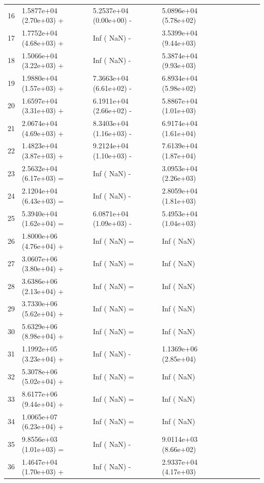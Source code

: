 \documentclass[11pt]{article}
\begin{document}
\begin{table}[htbp]
{\begin{tabular}{lllllllll}
16    & 1.5877e+04 (2.70e+03) + & 5.2537e+04 (0.00e+00) - & 5.0896e+04 (5.78e+02) \\
17    & 1.7752e+04 (4.68e+03) + & Inf (     NaN) -        & 3.5399e+04 (9.44e+03) \\
18    & 1.5066e+04 (3.22e+03) + & Inf (     NaN) -        & 5.3874e+04 (9.93e+03) \\
19    & 1.9880e+04 (1.57e+03) + & 7.3663e+04 (6.61e+02) - & 6.8934e+04 (5.98e+02) \\
20    & 1.6597e+04 (3.31e+03) + & 6.1911e+04 (2.66e+02) - & 5.8867e+04 (1.01e+03) \\
21    & 2.0674e+04 (4.69e+03) + & 8.3403e+04 (1.16e+03) - & 6.9174e+04 (1.61e+04) \\
22    & 1.4823e+04 (3.87e+03) + & 9.2124e+04 (1.10e+03) - & 7.6139e+04 (1.87e+04) \\
23    & 2.5632e+04 (6.17e+03) = & Inf (     NaN) -        & 3.0953e+04 (2.26e+03) \\
24    & 2.1204e+04 (6.43e+03) = & Inf (     NaN) -        & 2.8059e+04 (1.81e+03) \\
25    & 5.3940e+04 (1.62e+04) = & 6.0871e+04 (1.09e+03) - & 5.4953e+04 (1.04e+03) \\
26    & 1.8000e+06 (4.76e+04) + & Inf (     NaN) =        & Inf (     NaN)        \\
27    & 3.0607e+06 (3.80e+04) + & Inf (     NaN) =        & Inf (     NaN)        \\
28    & 3.6386e+06 (2.13e+04) + & Inf (     NaN) =        & Inf (     NaN)        \\
29    & 3.7330e+06 (5.62e+04) + & Inf (     NaN) =        & Inf (     NaN)        \\
30    & 5.6329e+06 (8.98e+04) + & Inf (     NaN) =        & Inf (     NaN)        \\
31    & 1.1992e+05 (3.23e+04) + & Inf (     NaN) -        & 1.1369e+06 (2.85e+04) \\
32    & 5.3078e+06 (5.02e+04) + & Inf (     NaN) =        & Inf (     NaN)        \\
33    & 8.6177e+06 (9.44e+04) + & Inf (     NaN) =        & Inf (     NaN)        \\
34    & 1.0065e+07 (6.23e+04) + & Inf (     NaN) =        & Inf (     NaN)        \\
35    & 9.8556e+03 (1.01e+03) = & Inf (     NaN) -        & 9.0114e+03 (8.66e+02) \\
36    & 1.4647e+04 (1.70e+03) + & Inf (     NaN) -        & 2.9337e+04 (4.17e+03) \\

\end{tabular}}
\end{table}
\end{document}
